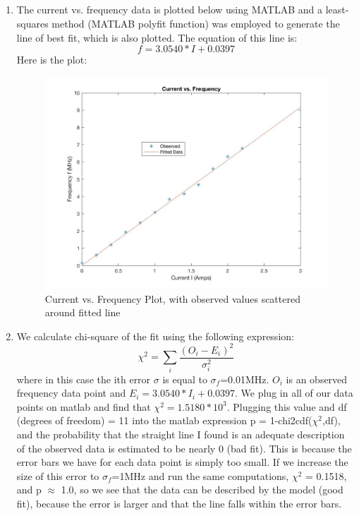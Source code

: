 \documentclass{article}
\begin{document}
    \subsection{}
    \begin{enumerate}
    \item The current vs. frequency data is plotted below using MATLAB and a least-squares method (MATLAB polyfit function) was employed to generate the line of best fit, which is also plotted. The equation of this line is:
    \begin{equation}
        f = 3.0540*I + 0.0397 
    \end{equation}
    Here is the plot:
    \begin{figure}[H]
    \centering
    \includegraphics[scale = 0.25]{6a.jpg}
    \caption{Current vs. Frequency Plot, with observed values scattered around fitted line}
    \label{fig:my_label}
\end{figure}
    \item We calculate chi-square of the fit using the following expression:
    \begin{equation}
        \chi^2 = \sum_i \frac{(O_i - E_i)^2}{\sigma_i^2}
    \end{equation}
    where in this case the ith error $\sigma$ is equal to $\sigma_f$=0.01MHz. $O_i$ is an observed frequency data point and $E_i = 3.0540*I_i + 0.0397$. We plug in all of our data points on matlab and find that $\chi^2 = 1.5180*10^3$. Plugging this value and df (degrees of freedom) = 11 into the matlab expression p = 1-chi2cdf($\chi^2$,df), and the probability that the straight line I found is an adequate description of the observed data is estimated to be nearly 0 (bad fit). This is because the error bars we have for each data point is simply too small. If we increase the size of this error to $\sigma_f$=1MHz and run the same computations, $\chi^2$ = 0.1518, and p $\approx$ 1.0, so we see that the data can be described by the model (good fit), because the error is larger and that the line falls within the error bars. 

\end{enumerate}
\end{document}
